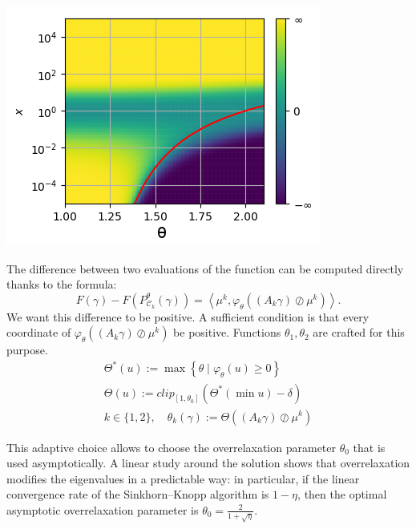 \documentclass[landscape,a0paper,fontscale=0.35]{baposter} %
\theoremstyle{plain}
\theoremstyle{plain}
\theoremstyle{plain}
\theoremstyle{plain}
\newcommand{\scal}[2]{\left\langle #1 , #2 \right\rangle}
\DeclareMathOperator{\Ccal}{\mathcal{C}}
\begin{document}
\begin{poster}
{    \begin{minipage}{0.35\textwidth}
    	\begin{tcolorbox}[size=small]
    	\centering
    	\includegraphics[width=\textwidth]{images/cvgce_zone_2.png}
    	\end{tcolorbox}
    \end{minipage}
    \begin{minipage}{0.65\textwidth}
    	The difference between two evaluations of the function can be computed directly thanks to the formula:
    	\begin{equation*} \label{eq:kl_diff_scal}
    	F(\gamma) - F(P^\theta_{\Ccal_k}(\gamma)) = 
    	\scal{\mu^k}{\varphi_\theta \left((A_k \gamma) \oslash \mu^k \right)}.
    	\end{equation*}
    	We want this difference to be positive. A sufficient condition is that every coordinate of $\varphi_\theta \left((A_k \gamma) \oslash \mu^k \right)$ be positive. Functions $\theta_1, \theta_2$ are crafted for this purpose.
    	\begin{gather*}
    	\Theta^*(u) := \max \left\{\theta \mid \varphi_\theta(u) \ge 0 \right\}
    	\\
    	\Theta(u) := clip_{[1,\theta_0]}(\Theta^*(\min u)-\delta)\\
    	k \in \{1,2\}, \quad \theta_k (\gamma) := \Theta((A_k \gamma) \oslash \mu^k)
    	\end{gather*}
    \end{minipage}
    This adaptive choice allows to choose the overrelaxation parameter $\theta_0$ that is used asymptotically. A linear study around the solution shows that overrelaxation modifies the eigenvalues in a predictable way: in particular, if the linear convergence rate of the Sinkhorn--Knopp algorithm is $1-\eta$, then the optimal asymptotic overrelaxation parameter is $\theta_0 = \frac{2}{1+\sqrt{\eta}}$.
}







\end{poster}
\end{document}
